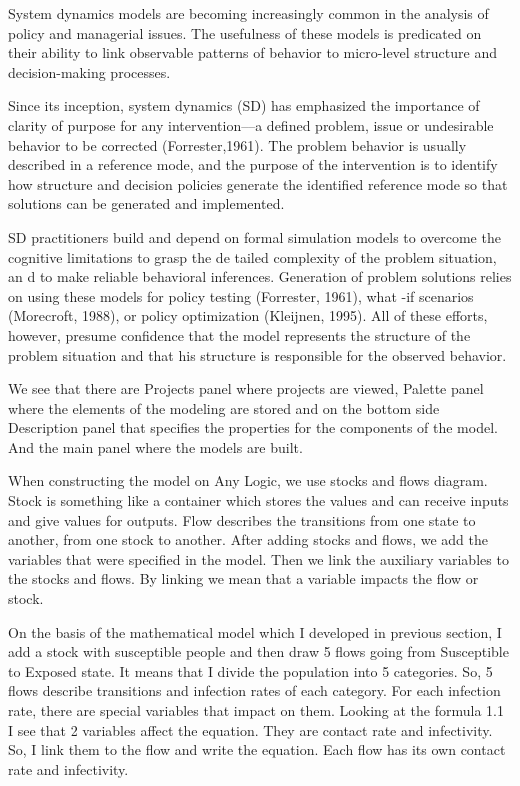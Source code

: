 System dynamics models are becoming increasingly common in the analysis of policy and managerial issues. The usefulness of these models is predicated on their ability to link observable patterns of behavior to micro-level structure and decision-making processes.

Since its inception, system dynamics (SD) has emphasized the importance of clarity of purpose for any intervention––a defined problem, issue or undesirable behavior to be corrected (Forrester,1961). The problem behavior is usually described in a reference mode, and the purpose of the intervention is to identify how structure and decision policies generate the identified reference mode so that solutions can be generated and implemented.

SD practitioners build and depend on formal simulation models to overcome the cognitive limitations to grasp the de tailed complexity of the problem situation, an d to make reliable behavioral inferences. Generation of problem solutions relies on using these models for policy testing (Forrester, 1961), what -if scenarios (Morecroft, 1988), or policy optimization (Kleijnen, 1995). All of these efforts, however, presume confidence that the model represents the structure of the problem situation and that his structure is responsible for the observed behavior.

We see that there are Projects panel where projects are viewed, Palette panel where the elements of the modeling are stored and on the bottom side Description panel that specifies the properties for the components of the model. And the main panel where the models are built.

When constructing the model on Any Logic, we use stocks and flows diagram. Stock is something like a container which stores the values and can receive inputs and give values for outputs. Flow describes the transitions from one state to another, from one stock to another. After adding stocks and flows, we add the variables that were specified in the model. Then we link the auxiliary variables to the stocks and flows. By linking we mean that a variable impacts the flow or stock.


On the basis of the mathematical model which I developed in previous section, I add a stock with susceptible people and then draw 5 flows going from Susceptible to Exposed state.  It means that I divide the population into 5 categories. So, 5 flows describe transitions and infection rates of each category. For each infection rate, there are special variables that impact on them. Looking at the formula 1.1 I see that 2 variables affect the equation. They are contact rate and infectivity. So, I link them to the flow and write the equation. Each flow has its own contact rate and infectivity.

